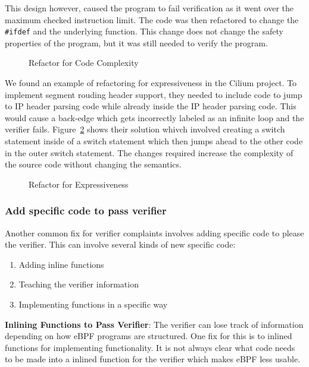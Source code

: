 This design however, caused the program to fail verification as it went over the maximum checked instruction limit. 
The code was then refactored to change the \texttt{\#ifdef} and the underlying function. 
This change does not change the safety properties of the program, but it was still needed to verify the program.

\begin{figure}
    
    \caption{Refactor for Code Complexity}
    \label{fig:refactor-fix}
\end{figure}


We found an example of refactoring for expressiveness in the Cilium project.
To implement segment rouding header support, they needed to include code to jump to IP header parsing code while already inside the IP header parsing code.
This would cause a back-edge which gets incorrectly labeled as an infinite loop and the verifier fails.
Figure~\ref{fig:switch} shows their solution whivch involved creating a switch statement inside of a switch statement which then jumps ahead to the other code in the outer switch statement.
The changes required increase the complexity of the source code without changing the semantics.

\begin{figure}
    
    \caption{Refactor for Expressiveness}
    \label{fig:switch}
\end{figure}

\subsubsection{Add specific code to pass verifier}
Another common fix for verifier complaints involves adding specific code to please 
    the verifier.
This can involve several kinds of new specific code:

\begin{enumerate}
    \item Adding inline functions
    \item Teaching the verifier information
    \item Implementing functions in a specific way
\end{enumerate}

\noindent\textbf{Inlining Functions to Pass Verifier}:
The verifier can lose track of information depending on how eBPF programs are structured.
One fix for this is to inlined functions for implementing functionality.
It is not always clear what code needs to be made into a inlined function for the verifier
    which makes eBPF less usable.


